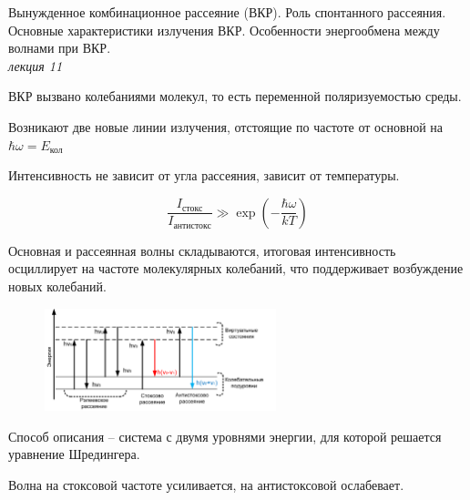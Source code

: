 
\begin{leftrules}
Вынужденное комбинационное рассеяние (ВКР). Роль спонтанного рассеяния. Основные характеристики излучения ВКР. Особенности энергообмена между волнами при ВКР.
\\ \phantom{42} \hfill \textit{лекция 11} 
\end{leftrules}



ВКР вызвано колебаниями молекул, то есть переменной поляризуемостью среды.

Возникают две новые линии излучения, отстоящие по частоте от основной на $\hbar \omega = E_{\text{кол}}$

Интенсивность не зависит от угла рассеяния, зависит от температуры.

\begin{equation}
    \frac{I_{\text{стокс}}}{I_{\text{антистокс}}} \gg \exp(-\frac{\hbar \omega}{k T})
\end{equation}

Основная и рассеянная волны складываются, итоговая интенсивность осциллирует на частоте молекулярных колебаний, что поддерживает возбуждение новых колебаний.

\begin{figure}[ht]
    \centering
    \includegraphics[width=0.6\textwidth]{figures/19-1.png}
\end{figure}

Способ описания -- система с двумя уровнями энергии, для которой решается уравнение Шредингера.

Волна на стоксовой частоте усиливается, на антистоксовой ослабевает.
